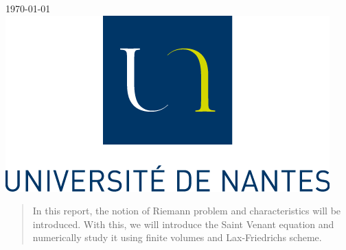 \begin{titlepage}

{\large \today}\\[2cm] %


\includegraphics{logo.png}\\[1cm] %
 

\vfill %

\end{titlepage}


\begin{abstract}


In this report, the notion of Riemann problem and characteristics will be introduced. With this, we will introduce the Saint Venant equation and numerically study it using finite volumes and Lax-Friedrichs scheme. 
\end{abstract}



\newpage
\tableofcontents

\newpage
